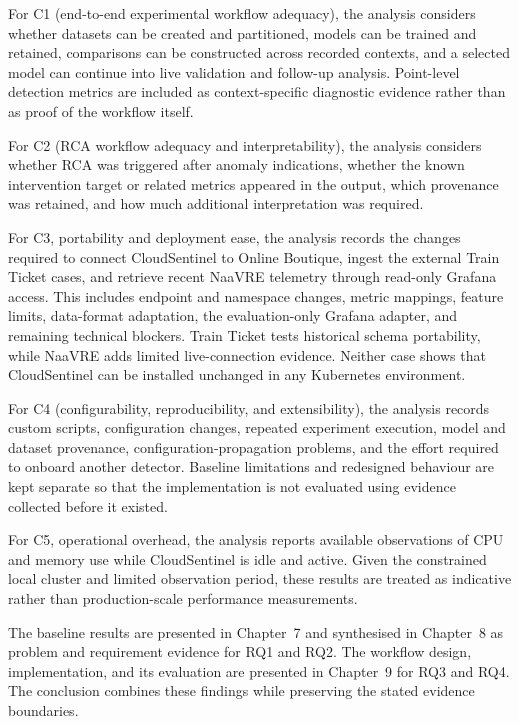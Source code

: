 For C1 (end-to-end experimental workflow adequacy), the analysis considers whether datasets can be created and partitioned, models can be trained and retained, comparisons can be constructed across recorded contexts, and a selected model can continue into live validation and follow-up analysis. Point-level detection metrics are included as context-specific diagnostic evidence rather than as proof of the workflow itself.

For C2 (RCA workflow adequacy and interpretability), the analysis considers whether RCA was triggered after anomaly indications, whether the known intervention target or related metrics appeared in the output, which provenance was retained, and how much additional interpretation was required.

For C3, portability and deployment ease, the analysis records the changes required to connect CloudSentinel to Online Boutique, ingest the external Train Ticket cases, and retrieve recent NaaVRE telemetry through read-only Grafana access. This includes endpoint and namespace changes, metric mappings, feature limits, data-format adaptation, the evaluation-only Grafana adapter, and remaining technical blockers. Train Ticket tests historical schema portability, while NaaVRE adds limited live-connection evidence. Neither case shows that CloudSentinel can be installed unchanged in any Kubernetes environment.

For C4 (configurability, reproducibility, and extensibility), the analysis records custom scripts, configuration changes, repeated experiment execution, model and dataset provenance, configuration-propagation problems, and the effort required to onboard another detector. Baseline limitations and redesigned behaviour are kept separate so that the implementation is not evaluated using evidence collected before it existed.

For C5, operational overhead, the analysis reports available observations of CPU and memory use while CloudSentinel is idle and active. Given the constrained local cluster and limited observation period, these results are treated as indicative rather than production-scale performance measurements.

The baseline results are presented in Chapter~7 and synthesised in Chapter~8 as problem and requirement evidence for RQ1 and RQ2. The workflow design, implementation, and its evaluation are presented in Chapter~9 for RQ3 and RQ4. The conclusion combines these findings while preserving the stated evidence boundaries.


